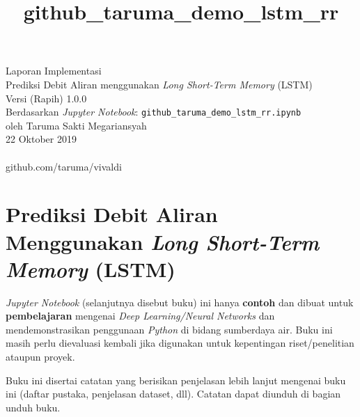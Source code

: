 \documentclass[11pt]{article}
\title{github\_taruma\_demo\_lstm\_rr}
\begin{document}
   
	\begin{titlepage}
		\vspace*{\fill}
		\begin{center}
 		\normalsize Laporan Implementasi \\
		\huge Prediksi Debit Aliran menggunakan \emph{Long Short-Term Memory} (LSTM)\\ 
		\normalsize Versi (Rapih) 1.0.0 \\[0.2cm]
      	\small Berdasarkan \emph{Jupyter Notebook}: \texttt{github\_taruma\_demo\_lstm\_rr.ipynb} \\[0.5cm]
		\normalsize oleh Taruma Sakti Megariansyah\\[0.5cm]
      	\normalsize 22 Oktober 2019\\[1cm]
    	\\
      	\normalsize github.com/taruma/vivaldi
		\end{center}
    	\vspace*{\fill}
	\end{titlepage}
    

    
    \hypertarget{prediksi-debit-aliran-menggunakan-long-short-term-memory-lstm}{%
\section{\texorpdfstring{Prediksi Debit Aliran Menggunakan \emph{Long
Short-Term Memory}
(LSTM)}{Prediksi Debit Aliran Menggunakan Long Short-Term Memory (LSTM)}}\label{prediksi-debit-aliran-menggunakan-long-short-term-memory-lstm}}

\emph{Jupyter Notebook} (selanjutnya disebut buku) ini hanya
\textbf{contoh} dan dibuat untuk \textbf{pembelajaran} mengenai
\emph{Deep Learning/Neural Networks} dan mendemonstrasikan penggunaan
\emph{Python} di bidang sumberdaya air. Buku ini masih perlu dievaluasi
kembali jika digunakan untuk kepentingan riset/penelitian ataupun
proyek.

Buku ini disertai catatan yang berisikan penjelasan lebih lanjut
mengenai buku ini (daftar pustaka, penjelasan dataset, dll). Catatan
dapat diunduh di bagian unduh buku.
\end{document}
